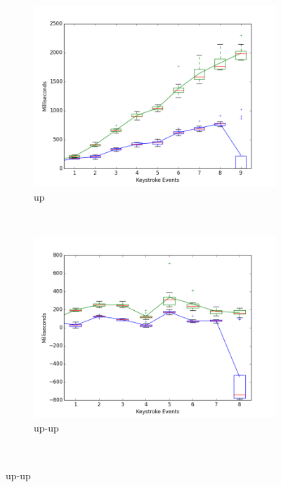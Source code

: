 \documentclass{article}
\begin{document}
\begin{figure}[H]
  \begin{subfigure}[b]{0.3\textwidth}
    \includegraphics[width=\textwidth]{biedenharn_jordan_up_final.png}
    \caption{up}
    \label{all_graphs:up}
  \end{subfigure}%
  ~ %
  \begin{subfigure}[b]{0.3\textwidth}
    \includegraphics[width=\textwidth]{biedenharn_jordan_up-up_final.png}
    \caption{up-up}
    \label{all_graphs:up-up}
  \end{subfigure}
  ~ %

\end{figure}
\end{document}

